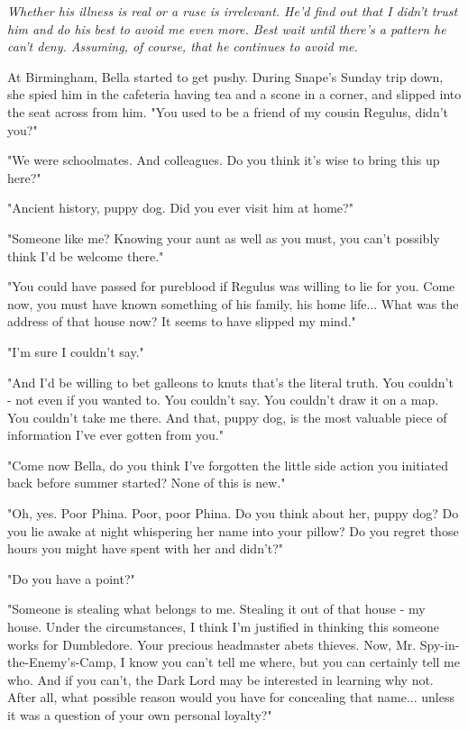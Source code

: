 \documentclass[a4paper,11pt]{article}
\begin{document}
\emph{Whether his illness is real or a ruse is irrelevant. He'd find out that I didn't trust him and do his best to avoid me even more. Best wait until there's a pattern he can't deny. Assuming, of course, that he continues to avoid me.}

At Birmingham, Bella started to get pushy. During Snape's Sunday trip down, she spied him in the cafeteria having tea and a scone in a corner, and slipped into the seat across from him. "You used to be a friend of my cousin Regulus, didn't you?"

"We were schoolmates. And colleagues. Do you think it's wise to bring this up here?"

"Ancient history, puppy dog. Did you ever visit him at home?"

"Someone like me? Knowing your aunt as well as you must, you can't possibly think I'd be welcome there."

"You could have passed for pureblood if Regulus was willing to lie for you. Come now, you must have known something of his family, his home life... What was the address of that house now? It seems to have slipped my mind."

"I'm sure I couldn't say."

"And I'd be willing to bet galleons to knuts that's the literal truth. You couldn't - not even if you wanted to. You couldn't say. You couldn't draw it on a map. You couldn't take me there. And that, puppy dog, is the most valuable piece of information I've ever gotten from you."

"Come now Bella, do you think I've forgotten the little side action you initiated back before summer started? None of this is new."

"Oh, yes. Poor Phina. Poor, poor Phina. Do you think about her, puppy dog? Do you lie awake at night whispering her name into your pillow? Do you regret those hours you might have spent with her and didn't?"

"Do you have a point?"

"Someone is stealing what belongs to me. Stealing it out of that house - my house. Under the circumstances, I think I'm justified in thinking this someone works for Dumbledore. Your precious headmaster abets thieves. Now, Mr. Spy-in-the-Enemy's-Camp, I know you can't tell me where, but you can certainly tell me who. And if you can't, the Dark Lord may be interested in learning why not. After all, what possible reason would you have for concealing that name... unless it was a question of your own personal loyalty?"
\end{document}
